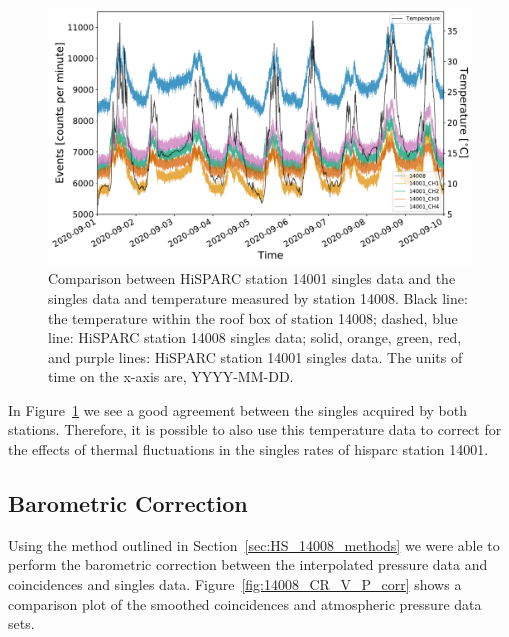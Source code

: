 \begin{figure}[ht!]
	\centering
	\includegraphics[width=0.8\columnwidth]{HS_14008_vs_14001_and_temp.pdf}
	\caption{Comparison between HiSPARC station 14001 singles data and the singles data and temperature measured by station 14008. Black line: the temperature within the roof box of station 14008; dashed, blue line: HiSPARC station 14008 singles data; solid, orange, green, red, and purple lines: HiSPARC station 14001 singles data. The units of time on the x-axis are, YYYY-MM-DD.}
	\label{fig:HS_14008_14001_vs_T}
\end{figure}

In Figure~\ref{fig:HS_14008_14001_vs_T} we see a good agreement between the singles acquired by both stations. Therefore, it is possible to also use this temperature data to correct for the effects of thermal fluctuations in the singles rates of \gls{hisparc} station 14001.



\subsection{Barometric Correction}\label{sec:HS_14008_P_corr}


Using the method outlined in Section~\ref{sec:HS_14008_methods} we were able to perform the barometric correction between the interpolated pressure data and coincidences and singles data. Figure~\ref{fig:14008_CR_V_P_corr} shows a comparison plot of the smoothed coincidences and atmospheric pressure data sets.


